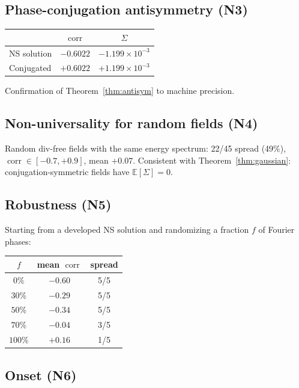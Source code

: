 \documentclass[11pt]{article}
\theoremstyle{definition}
\newcommand{\E}{\mathbb{E}}
\DeclareMathOperator{\corr}{corr}
\begin{document}
\subsection{Phase-conjugation antisymmetry (N3)}

\begin{center}
\begin{tabular}{@{}lcc@{}}
\toprule
& $\corr$ & $\Sigma$ \\
\midrule
NS solution     & $-0.6022$ & $-1.199\times 10^{-3}$ \\
Conjugated      & $+0.6022$ & $+1.199\times 10^{-3}$ \\
\bottomrule
\end{tabular}
\end{center}
Confirmation of Theorem~\ref{thm:antisym} to machine
precision.

\subsection{Non-universality for random fields (N4)}

Random div-free fields with the same energy spectrum:
22/45 spread (49\%), $\corr\in[-0.7,+0.9]$,
mean $+0.07$.  Consistent with
Theorem~\ref{thm:gaussian}: conjugation-symmetric fields
have $\E[\Sigma]=0$.

\subsection{Robustness (N5)}

Starting from a developed NS solution and randomizing
a fraction $f$ of Fourier phases:
\begin{center}
\begin{tabular}{@{}ccc@{}}
\toprule
$f$ & mean $\corr$ & spread \\
\midrule
$0\%$ & $-0.60$ & 5/5 \\
$30\%$ & $-0.29$ & 5/5 \\
$50\%$ & $-0.34$ & 5/5 \\
$70\%$ & $-0.04$ & 3/5 \\
$100\%$ & $+0.16$ & 1/5 \\
\bottomrule
\end{tabular}
\end{center}

\subsection{Onset (N6)}
\end{document}

